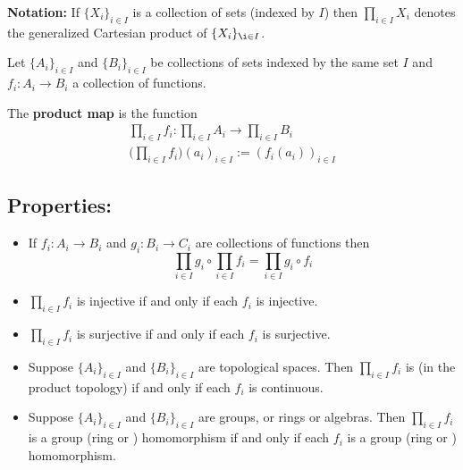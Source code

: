 \documentclass[12pt]{article}
\begin{document}

{\bf Notation:} If $\{X_i\}_{i \in I}$ is a collection of sets (indexed by $I$) then $\displaystyle \prod_{i \in I} X_i$ denotes the generalized Cartesian product of $\{X_i\}_{\i \in I}$.

Let $\{A_i\}_{i\in I}$ and $\{B_i\}_{i\in I}$ be collections of sets indexed by the same set $I$ and $f_i:A_i\longrightarrow B_i$ a collection of functions.

The {\bf product map} is the function
\begin{align*}
\prod_{i \in I} f_i : \prod_{i \in I} A_i \longrightarrow \prod_{i \in I} B_i\\
\Big( \prod_{i \in I} f_i \Big) (a_i)_{i \in I} := (f_i(a_i))_{i \in I}
\end{align*}

\subsection{Properties:}
\begin{itemize}
\item If $f_i:A_i\longrightarrow B_i$ and $g_i:B_i\longrightarrow C_i$ are collections of functions then 
\begin{displaymath}
\prod_{i \in I} g_i \circ \prod_{i \in I} f_i = \prod_{i \in I} g_i \circ f_i
\end{displaymath}
\item $\displaystyle \prod_{i \in I} f_i$ is injective if and only if each $f_i$ is injective.
\item $\displaystyle \prod_{i \in I} f_i$ is surjective if and only if each $f_i$ is surjective.
\item Suppose $\{A_i\}_{i \in I}$ and $\{B_i\}_{i \in I}$ are topological spaces. Then $\displaystyle \prod_{i \in I} f_i$ is  (in the product topology) if and only if each $f_i$ is continuous.
\item Suppose $\{A_i\}_{i \in I}$ and $\{B_i\}_{i \in I}$ are groups, or rings or algebras. Then $\displaystyle \prod_{i \in I} f_i$ is a group (ring or ) homomorphism if and only if each $f_i$ is a group (ring or ) homomorphism.
\end{itemize}
\end{document}
